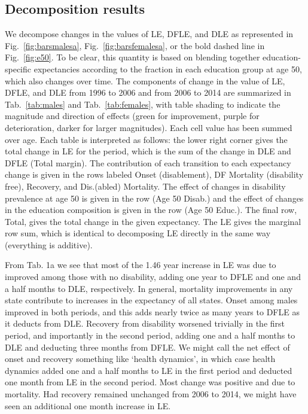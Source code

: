 \subsection{Decomposition results}
We decompose changes in the values of LE, DFLE, and DLE as represented in Fig.~\ref{fig:barsmalesa}, Fig.~\ref{fig:barsfemalesa}, or the bold dashed line in Fig.~\ref{fig:e50}. To be clear, this quantity is based on blending together education-specific expectancies according to the fraction in each education group at age 50, which also changes over time. The components of change in the value of LE, DFLE, and DLE from 1996 to 2006 and from 2006 to 2014 are summarized in Tab.~\ref{tab:males} and Tab.~\ref{tab:females}, with table shading to indicate the magnitude and direction of effects (green for improvement, purple for deterioration, darker for larger magnitudes). Each cell value has been summed over age. Each table is interpreted as follows: the lower right corner gives the total change in LE for the period, which is the sum of the change in DLE and DFLE (Total margin). The contribution of each transition to each expectancy change is given in the rows labeled Onset (disablement), DF Mortality (disability free), Recovery, and Dis.(abled) Mortality. The effect of changes in disability prevalence at age 50 is given in the  row (Age 50 Disab.) and the effect of changes in the education composition is given in the  row (Age 50 Educ.). The final row, Total, gives the total change in the given expectancy. The LE gives the marginal row sum, which is identical to decomposing LE directly in the same way (everything is additive).

From Tab. 1a we see that most of the 1.46 year increase in LE was due to improved among those with no disability, adding one year to DFLE and one and a half months to DLE, respectively. In general, mortality improvements in any state contribute to increases in the expectancy of all states. Onset among males improved in both periods, and this adds nearly twice as many years to DFLE as it deducts from DLE. Recovery from disability worsened trivially in the first period, and importantly in the second period, adding one and a half months to DLE and deducting three months from DFLE. We might call the net effect of onset and recovery something like `health dynamics', in which case health dynamics added one and a half months to LE in the first period and deducted one month from LE in the second period. Most change was positive and due to mortality. Had recovery remained unchanged from 2006 to 2014, we might have seen an additional one month increase in LE.

